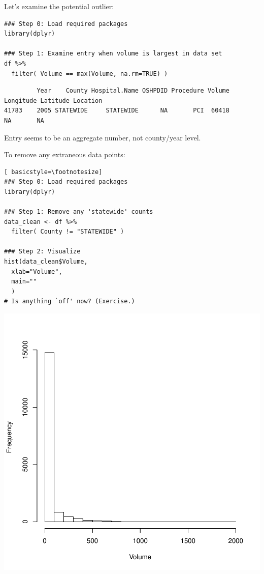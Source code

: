 \begin{frame}
\newpage      
Let's examine the potential outlier:
  \begin{lstlisting}
### Step 0: Load required packages
library(dplyr)

### Step 1: Examine entry when volume is largest in data set
df %>%
  filter( Volume == max(Volume, na.rm=TRUE) )

  \end{lstlisting}
{ \tiny
\begin{verbatim}
         Year    County Hospital.Name OSHPDID Procedure Volume Longitude Latitude Location
41783    2005 STATEWIDE     STATEWIDE      NA       PCI  60418        NA       NA         
\end{verbatim}
}

Entry seems to be an aggregate number, not county/year level.  
\newpage

To remove any extraneous data points:
  \begin{lstlisting}[ basicstyle=\footnotesize]
### Step 0: Load required packages
library(dplyr)

### Step 1: Remove any 'statewide' counts
data_clean <- df %>%
  filter( County != "STATEWIDE" )

### Step 2: Visualize
hist(data_clean$Volume,
  xlab="Volume",
  main=""
  )
# Is anything `off' now? (Exercise.)
  \end{lstlisting}

\newpage
    \begin{center}
       \includegraphics[scale=0.42]{images/histogram2.pdf}
    \end{center}   

\end{frame}

